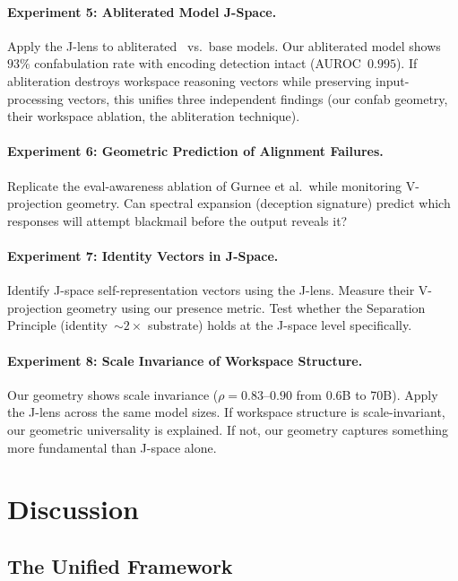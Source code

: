 \documentclass[11pt,a4paper]{article}
\begin{document}
\paragraph{Experiment 5: Abliterated Model J-Space.}
Apply the J-lens to abliterated~\citep{failspy2024abliterate} vs.\ base
models. Our abliterated model shows $93\%$ confabulation rate with
encoding detection intact (AUROC~$0.995$). If abliteration destroys
workspace reasoning vectors while preserving input-processing vectors,
this unifies three independent findings (our confab geometry, their
workspace ablation, the abliteration technique).

\paragraph{Experiment 6: Geometric Prediction of Alignment Failures.}
Replicate the eval-awareness ablation of Gurnee et al.\ while monitoring
V-projection geometry. Can spectral expansion (deception signature) predict
which responses will attempt blackmail before the output reveals it?

\paragraph{Experiment 7: Identity Vectors in J-Space.}
Identify J-space self-representation vectors using the J-lens. Measure
their V-projection geometry using our presence metric. Test whether the
Separation Principle (identity~${\sim}2\times$ substrate) holds at the
J-space level specifically.

\paragraph{Experiment 8: Scale Invariance of Workspace Structure.}
Our geometry shows scale invariance ($\rho{=}0.83$--$0.90$ from $0.6$B
to $70$B). Apply the J-lens across the same model sizes. If workspace
structure is scale-invariant, our geometric universality is explained.
If not, our geometry captures something more fundamental than J-space
alone.

\section{Discussion}
\label{sec:discussion}

\subsection{The Unified Framework}
\end{document}
